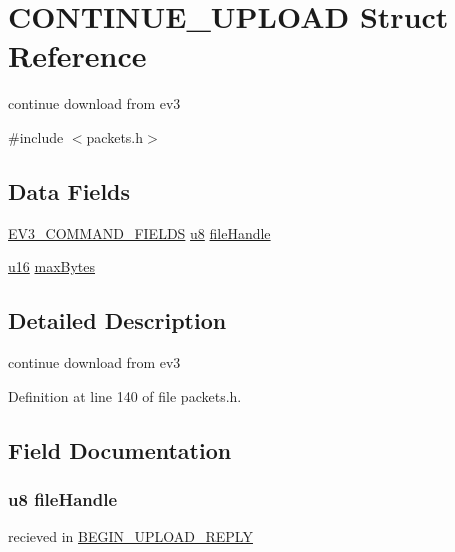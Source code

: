 \hypertarget{struct_c_o_n_t_i_n_u_e___u_p_l_o_a_d}{}\section{C\+O\+N\+T\+I\+N\+U\+E\+\_\+\+U\+P\+L\+O\+A\+D Struct Reference}
\label{struct_c_o_n_t_i_n_u_e___u_p_l_o_a_d}


continue download from ev3  




{\ttfamily \#include $<$packets.\+h$>$}

\subsection*{Data Fields}
\begin{DoxyCompactItemize}
\item 
\hyperlink{packets_8h_a0c26a010ef0da2962a751796943824c9}{E\+V3\+\_\+\+C\+O\+M\+M\+A\+N\+D\+\_\+\+F\+I\+E\+L\+D\+S} \hyperlink{defs_8h_a92c50087ca0e64fa93fc59402c55f8ca}{u8} \hyperlink{struct_c_o_n_t_i_n_u_e___u_p_l_o_a_d_a56fd3710165ab3fa738989d317905db6}{file\+Handle}
\item 
\hyperlink{defs_8h_ace9d960e74685e2cd84b36132dbbf8aa}{u16} \hyperlink{struct_c_o_n_t_i_n_u_e___u_p_l_o_a_d_a5fc37bdf9450601c27c038ad0ded1304}{max\+Bytes}
\end{DoxyCompactItemize}


\subsection{Detailed Description}
continue download from ev3 

Definition at line 140 of file packets.\+h.



\subsection{Field Documentation}
\hypertarget{struct_c_o_n_t_i_n_u_e___u_p_l_o_a_d_a56fd3710165ab3fa738989d317905db6}{}
\subsubsection[{file\+Handle}]{ {\bf u8} file\+Handle}\label{struct_c_o_n_t_i_n_u_e___u_p_l_o_a_d_a56fd3710165ab3fa738989d317905db6}
recieved in \hyperlink{struct_b_e_g_i_n___u_p_l_o_a_d___r_e_p_l_y}{B\+E\+G\+I\+N\+\_\+\+U\+P\+L\+O\+A\+D\+\_\+\+R\+E\+P\+L\+Y} 

